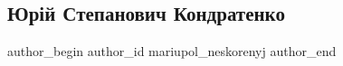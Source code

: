  
 
 
 
 

\subsection{Юрій Степанович Кондратенко}
\label{sec:17_08_2023.fb.mariupol_neskorenyj.1.jurij_stepanovych_kondratenko}

\ifcmt
 author_begin
   author_id mariupol_neskorenyj
 author_end
\fi

